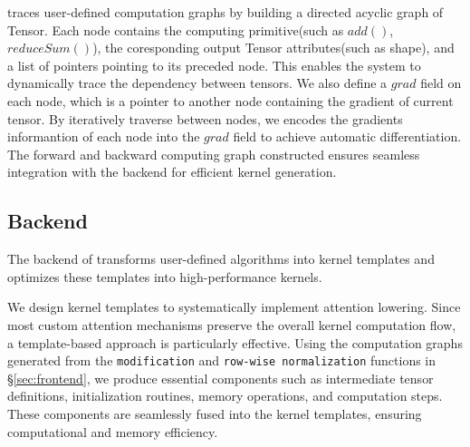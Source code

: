 \oursys{} traces user-defined computation graphs by building a directed acyclic graph of Tensor. Each node contains the computing primitive(such as $add()$, $reduceSum()$), the coresponding output Tensor attributes(such as shape), and a list of pointers pointing to its preceded node. This enables the system to dynamically trace the dependency between tensors.
We also define a $grad$ field on each node, which is a pointer to another node containing the gradient of current tensor. By iteratively traverse between nodes, we encodes the gradients informantion of each node into the $grad$ field to achieve automatic differentiation.
The forward and backward computing graph \oursys{} constructed ensures seamless integration with the backend for efficient kernel generation.


\subsection{Backend}
\label{sec:backend}
The backend of \oursys{} transforms user-defined algorithms into kernel templates and optimizes these templates into high-performance kernels.


We design kernel templates to systematically implement attention lowering. Since most custom attention mechanisms preserve the overall kernel computation flow, a template-based approach is particularly effective. Using the computation graphs generated from the \texttt{modification} and \texttt{row-wise normalization} functions in \S\ref{sec:frontend}, we produce essential components such as intermediate tensor definitions, initialization routines, memory operations, and computation steps. These components are seamlessly fused into the kernel templates, ensuring computational and memory efficiency.


